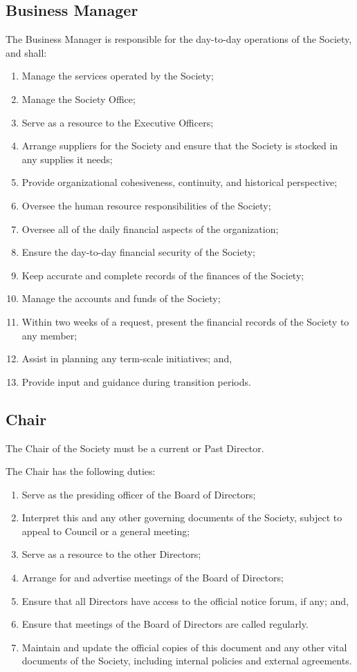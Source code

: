 \subsection{Business Manager}
The Business Manager is responsible for the day-to-day operations of the 
Society, and shall:
\begin{enumerate}
    \item Manage the services operated by the Society;
    \item Manage the Society Office;
    \item Serve as a resource to the Executive Officers;
    \item Arrange suppliers for the Society and ensure that the Society is
        stocked in any supplies it needs;
    \item Provide organizational cohesiveness, continuity, and historical
        perspective;
    \item Oversee the human resource responsibilities of the Society;
    \item Oversee all of the daily financial aspects of the organization;
    \item Ensure the day-to-day financial security of the Society;
    \item Keep accurate and complete records of the finances of the Society;
    \item Manage the accounts and funds of the Society;
    \item Within two weeks of a request, present the financial records of the
        Society to any member;
    \item Assist in planning any term-scale initiatives; and,
    \item Provide input and guidance during transition periods.
\end{enumerate}

\subsection{Chair}
The Chair of the Society must be a current or Past Director.

The Chair has the following duties:
\begin{enumerate}
    \item Serve as the presiding officer of the Board of Directors;
    \item Interpret this and any other governing documents of the Society,
        subject to appeal to Council or a general meeting;
    \item Serve as a resource to the other Directors;
    \item Arrange for and advertise meetings of the Board of Directors;
    \item Ensure that all Directors have access to the official notice
        forum, if any; and,
    \item Ensure that meetings of the Board of Directors are called regularly.
    \item Maintain and update the official copies of this document and any other
        vital documents of the Society, including internal policies and external
        agreements.
\end{enumerate}

